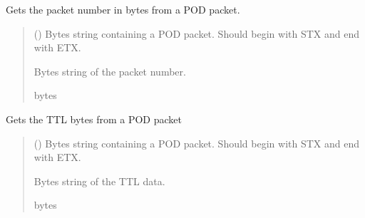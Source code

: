 \documentclass[letterpaper,10pt,english]{sphinxmanual}
\begin{document}
\begin{fulllineitems}
\begin{fulllineitems}
\label{\detokenize{Morelia.Packets:Morelia.Packets.Binary4.PacketBinary4.GetPacketNumber}}
\pysigstartsignatures
{}
\pysigstopsignatures
\sphinxAtStartPar
Gets the packet number in bytes from a POD packet.
\begin{quote}\begin{description}
\sphinxAtStartPar
{} () \textendash{} Bytes string containing a POD packet. Should begin with STX and                 end with ETX.

\sphinxAtStartPar
Bytes string of the packet number.

\sphinxAtStartPar
bytes

\end{description}\end{quote}

\end{fulllineitems}


\begin{fulllineitems}
\label{\detokenize{Morelia.Packets:Morelia.Packets.Binary4.PacketBinary4.GetTTL}}
\pysigstartsignatures
{}
\pysigstopsignatures
\sphinxAtStartPar
Gets the TTL bytes from a POD packet
\begin{quote}\begin{description}
\sphinxAtStartPar
{} () \textendash{} Bytes string containing a POD packet. Should begin with STX and                 end with ETX.

\sphinxAtStartPar
Bytes string of the TTL data.

\sphinxAtStartPar
bytes


\end{description}
\end{quote}
\end{fulllineitems}
\end{fulllineitems}
\end{document}
